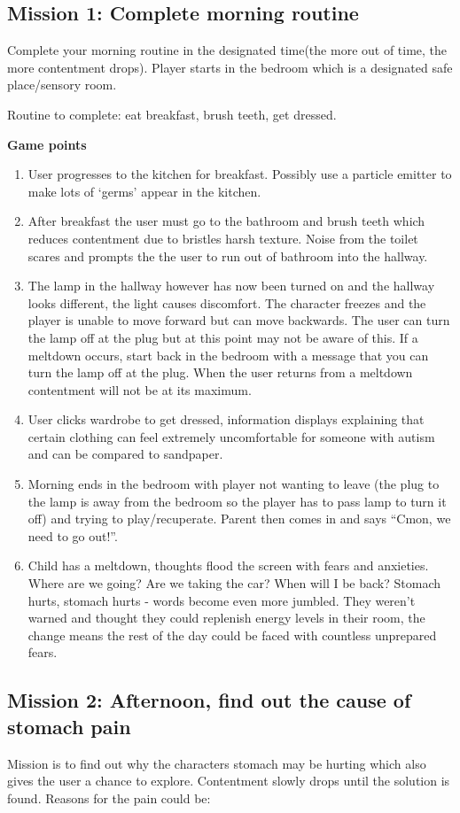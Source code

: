 \documentclass[11pt]{report}
\begin{document}
\subsection*{Mission 1: Complete morning routine}
Complete your morning routine in the designated time(the more out of time, the more contentment drops). Player starts in the bedroom which is a designated safe place/sensory room. 

Routine to complete: eat breakfast, brush teeth, get dressed.

\textbf{Game points}
\begin{enumerate}
\item User progresses to the kitchen for breakfast. Possibly use a particle emitter to make lots of ‘germs’ appear in the kitchen.
\item After breakfast the user must go to the bathroom and brush teeth which reduces contentment due to bristles harsh texture. Noise from the toilet scares and prompts the the user to run out of bathroom into the hallway.
\item The lamp in the hallway however has now been turned on and the hallway looks different, the light causes discomfort. The character freezes and the player is unable to move forward but can move backwards. The user can turn the lamp off at the plug but at this point may not be aware of this. If a meltdown occurs, start back in the bedroom with a message that you can turn the lamp off at the plug. When the user returns from a meltdown contentment will not be at its maximum.
\item User clicks wardrobe to get dressed, information displays explaining that certain clothing can feel extremely uncomfortable for someone with autism and can be compared to sandpaper.
\item Morning ends in the bedroom with player not wanting to leave (the plug to the lamp is away from the bedroom so the player has to pass lamp to turn it off) and trying to play/recuperate. Parent then comes in and says “Cmon, we need to go out!”.
\item Child has a meltdown, thoughts flood the screen with fears and anxieties. Where are we going? Are we taking the car? When will I be back? Stomach hurts, stomach hurts - words become even more jumbled. They weren't warned and thought they could replenish energy levels in their room, the change means the rest of the day could be faced with countless unprepared fears.
\end{enumerate}

\subsection*{Mission 2: Afternoon, find out the cause of stomach pain}
Mission is to find out why the characters stomach may be hurting which also gives the user a chance to explore. Contentment slowly drops until the solution is found. Reasons for the pain could be:
\end{document}
